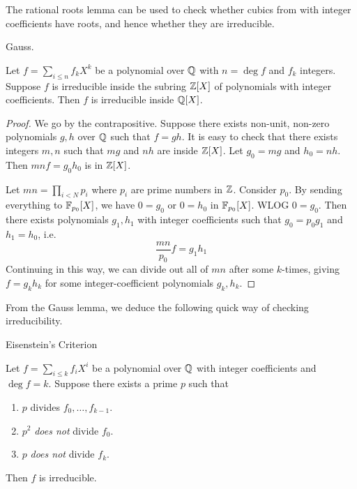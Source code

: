 \documentclass[../book.tex]{subfiles}
\begin{document}
\begin{rmk}
    
    The rational roots lemma can be used to check 
    whether cubics from with integer coefficients have roots,
    and hence whether they are irreducible. 
    
\end{rmk}

\begin{lem} Gauss.
    
    Let $f = \sum_{i \leq n} f_k X^k$ be a polynomial over $\mathbb{Q}$ 
    with $n = \deg f$ and $f_k$ integers. 
    Suppose $f$ is irreducible inside the subring $\mathbb{Z}[X]$ 
    of polynomials with integer coefficients. 
    Then $f$ is irreducible inside $\mathbb{Q}[X]$. 
    
\end{lem}
\begin{proof}
    
    We go by the contrapositive. 
    Suppose there exists non-unit, non-zero polynomials $g, h$ over $\mathbb{Q}$
    such that $f = g h$. 
    It is easy to check that there exists integers $m, n$ such that 
    $m g$ and $n h$ are inside $\mathbb{Z}[X]$. 
    Let $g_0 = mg$ and $h_0 = nh$. 
    Then $m n f = g_0 h_0$ is in $\mathbb{Z}[X]$.
    
    Let $m n = \prod_{i < N} p_i$ where $p_i$ are prime numbers in $\mathbb{Z}$. 
    Consider $p_0$. By sending everything to $\mathbb{F}_{p_0}[X]$, 
    we have $0 = g_0$ or $0 = h_0$ in $\mathbb{F}_{p_0}[X]$. 
    WLOG $0 = g_0$. Then there exists polynomials $g_1, h_1$ with integer coefficients
    such that $g_0 = p_0 g_1$ and $h_1 = h_0$,
    i.e. \[
        \frac{mn}{p_0} f = g_1 h_1
    \]
    Continuing in this way, we can divide out all of $mn$ after some $k$-times,  
    giving $f = g_k h_k$ for some integer-coefficient polynomials $g_k, h_k$. 
    
\end{proof}
From the Gauss lemma, we deduce the following quick way of checking irreducibility. 
\begin{thm} Eisenstein's Criterion
    
    Let $f = \sum_{i \leq k} f_i X^i$ be a polynomial over $\mathbb{Q}$ 
    with integer coefficients and $\deg f = k$.
    Suppose there exists a prime $p$ such that \begin{enumerate}
        \item $p$ divides $f_0, \dots, f_{k-1}$.
        \item $p^2$ \emph{does not} divide $f_0$.
        \item $p$ \emph{does not} divide $f_k$.
    \end{enumerate}
    Then $f$ is irreducible. 
    
\end{thm}
\end{document}
